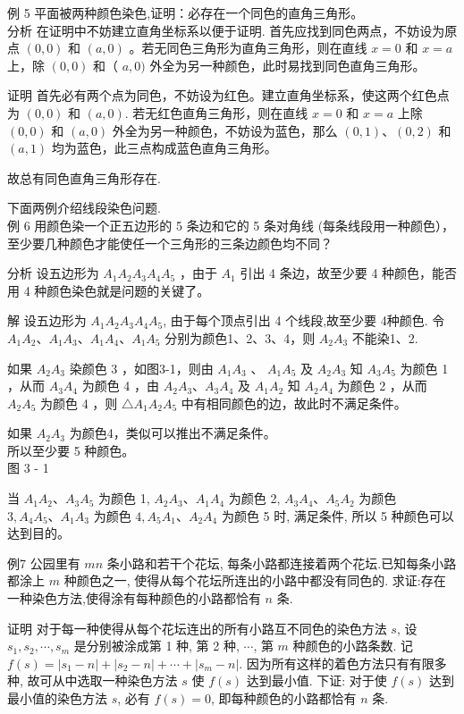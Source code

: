 \documentclass[10pt]{article}
\begin{document}
例 5 平面被两种颜色染色,证明：必存在一个同色的直角三角形。\\
分析 在证明中不妨建立直角坐标系以便于证明. 首先应找到同色两点，不妨设为原点 $(0,0)$ 和 $(a, 0)$ 。若无同色三角形为直角三角形，则在直线 $x=0$ 和 $x=a$ 上，除 $(0,0)$ 和（ $a, 0)$ 外全为另一种颜色，此时易找到同色直角三角形。

证明 首先必有两个点为同色，不妨设为红色。建立直角坐标系，使这两个红色点为 $(0,0)$ 和 $(a, 0)$. 若无红色直角三角形，则在直线 $x=0$ 和 $x=a$ 上除 $(0,0)$ 和 $(a, 0)$ 外全为另一种颜色，不妨设为蓝色，那么 $(0,1) 、(0,2)$ 和 $(a, 1)$ 均为蓝色，此三点构成蓝色直角三角形。

故总有同色直角三角形存在.

下面两例介绍线段染色问题.\\
例 6 用颜色染一个正五边形的 5 条边和它的 5 条对角线 (每条线段用一种颜色），至少要几种颜色才能使任一个三角形的三条边颜色均不同？

分析 设五边形为 $A_{1} A_{2} A_{3} A_{4} A_{5}$ ，由于 $A_{1}$ 引出 4 条边，故至少要 4 种颜色，能否用 4 种颜色染色就是问题的关键了。

解 设五边形为 $A_{1} A_{2} A_{3} A_{4} A_{5}$, 由于每个顶点引出 4 个线段,故至少要 4种颜色. 令 $A_{1} A_{2} 、 A_{1} A_{3} 、 A_{1} A_{4} 、 A_{1} A_{5}$ 分别为颜色1、2、3、4，则 $A_{2} A_{3}$ 不能染1、2.

如果 $A_{2} A_{3}$ 染颜色 3 ，如图3-1，则由 $A_{1} A_{3}$ 、 $A_{1} A_{5}$ 及 $A_{2} A_{3}$ 知 $A_{3} A_{5}$ 为颜色 1 ，从而 $A_{3} A_{4}$ 为颜色 4 ，由 $A_{2} A_{3} 、 A_{3} A_{4}$ 及 $A_{1} A_{2}$ 知 $A_{2} A_{4}$ 为颜色 2 ，从而 $A_{2} A_{5}$ 为颜色 4 ，则 $\triangle A_{1} A_{2} A_{5}$ 中有相同颜色的边，故此时不满足条件。

如果 $A_{2} A_{3}$ 为颜色4，类似可以推出不满足条件。\\
所以至少要 5 种颜色。\\
图 3 - 1

当 $A_{1} A_{2} 、 A_{3} A_{5}$ 为颜色 1, $A_{2} A_{3} 、 A_{1} A_{4}$ 为颜色 2, $A_{3} A_{4} 、 A_{5} A_{2}$ 为颜色 $3, A_{4} A_{5} 、 A_{1} A_{3}$ 为颜色 $4, A_{5} A_{1} 、 A_{2} A_{4}$ 为颜色 5 时, 满足条件, 所以 5 种颜色可以达到目的。

例7 公园里有 $m n$ 条小路和若干个花坛, 每条小路都连接着两个花坛.已知每条小路都涂上 $m$ 种颜色之一, 使得从每个花坛所连出的小路中都没有同色的. 求证:存在一种染色方法,使得涂有每种颜色的小路都恰有 $n$ 条.

证明 对于每一种使得从每个花坛连出的所有小路互不同色的染色方法 $s$, 设 $s_{1}, s_{2}, \cdots, s_{m}$ 是分别被涂成第 1 种, 第 2 种, $\cdots$, 第 $m$ 种颜色的小路条数. 记 $f(s)=\left|s_{1}-n\right|+\left|s_{2}-n\right|+\cdots+\left|s_{m}-n\right|$. 因为所有这样的着色方法只有有限多种, 故可从中选取一种染色方法 $s$ 使 $f(s)$ 达到最小值. 下证: 对于使 $f(s)$ 达到最小值的染色方法 $s$, 必有 $f(s)=0$, 即每种颜色的小路都恰有 $n$ 条.
\end{document}
